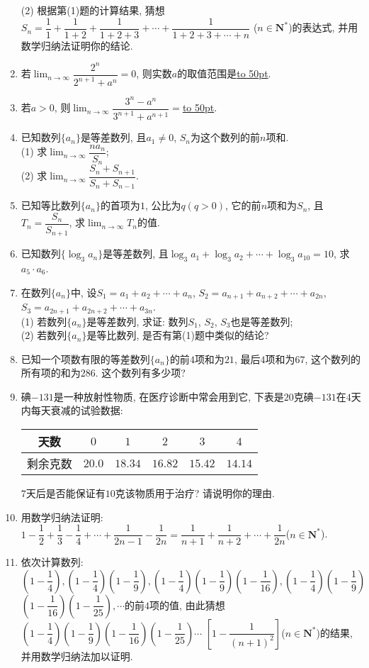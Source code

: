\documentclass[10pt,a4paper]{article}
\newcommand{\blank}[1]{\underline{\hbox to #1pt{}}}
\begin{document}
\begin{enumerate}[1.]
(2) 根据第(1)题的计算结果, 猜想$S_n=\dfrac 11+\dfrac 1{1+2}+\dfrac 1{1+2+3}+\cdots +\dfrac 1{1+2+3+\cdots +n}$ ($n\in \mathbf{N}^*$)的表达式, 并用数学归纳法证明你的结论.
\item 若$\displaystyle\lim_{n\to\infty}\dfrac{2^n}{2^{n+1}+a^n}=0$, 则实数$a$的取值范围是\blank{50}.
\item 若$a>0$, 则$\displaystyle\lim_{n\to\infty}\dfrac{3^n-a^n}{3^{n+1}+a^{n+1}}=$\blank{50}.
\item 已知数列$\{a_n\}$是等差数列, 且$a_1\ne 0$, $S_n$为这个数列的前$n$项和.\\
(1) 求$\displaystyle\lim_{n\to\infty}\dfrac{na_n}{S_n}$;\\
(2) 求$\displaystyle\lim_{n\to\infty}\dfrac{S_n+S_{n+1}}{S_n+S_{n-1}}$.
\item 已知等比数列$\{a_n\}$的首项为$1$, 公比为$q(q>0)$, 它的前$n$项和为$S_n$, 且$T_n=\dfrac{S_n}{S_{n+1}}$, 求$\displaystyle\lim_{n\to\infty}T_n$的值.
\item 已知数列$\{\log _3a_n\}$是等差数列, 且$\log _3a_1+\log _3a_2+\cdots +\log _3a_{10}=10$, 求$a_5\cdot a_6$.
\item 在数列$\{a_n\}$中, 设$S_1=a_1+a_2+\cdots +a_n$, $S_2=a_{n+1}+a_{n+2}+\cdots +a_{2n}$, $S_3=a_{2n+1}+a_{2n+2}+\cdots +a_{3n}$.\\
(1) 若数列$\{a_n\}$是等差数列, 求证: 数列$S_1$, $S_2$, $S_3$也是等差数列;\\
(2) 若数列$\{a_n\}$是等比数列, 是否有第(1)题中类似的结论?
\item 已知一个项数有限的等差数列$\{a_n\}$的前$4$项和为$21$, 最后$4$项和为$67$, 这个数列的所有项的和为$286$. 这个数列有多少项?
\item 碘$-131$是一种放射性物质, 在医疗诊断中常会用到它, 下表是$20$克碘$-131$在$4$天内每天衰减的试验数据:\\
\begin{center}
    \begin{tabular}{|c|c|c|c|c|c|}
    \hline
    天数 &	$0$ & $1$ & $2$ & $3$ & $4$ \\ \hline
    剩余克数 & $20.0$ & $18.34$ & $16.82$ & $15.42$ & $14.14$ \\ \hline
    \end{tabular}
\end{center}
$7$天后是否能保证有$10$克该物质用于治疗? 请说明你的理由.
\item 用数学归纳法证明:
$1-\dfrac 12+\dfrac 13-\dfrac 14+\cdots +\dfrac 1{2n-1}-\dfrac 1{2n}=\dfrac 1{n+1}+\dfrac 1{n+2}+\cdots +\dfrac 1{2n}$($n\in \mathbf{N}^*$).
\item 依次计算数列: $(1-\dfrac 14),(1-\dfrac 14)(1-\dfrac 19),(1-\dfrac 14)(1-\dfrac 19)(1-\dfrac 1{16}),(1-\dfrac 14)(1-\dfrac 19)$ $(1-\dfrac 1{16})(1-\dfrac 1{25}),\cdots$的前$4$项的值, 由此猜想$(1-\dfrac 14)(1-\dfrac 19)(1-\dfrac 1{16})(1-\dfrac 1{25})\cdots$ $[1-\dfrac 1{(n+1)^2}]$($n\in \mathbf{N}^*$)的结果, 并用数学归纳法加以证明.

\end{enumerate}
\end{document}

